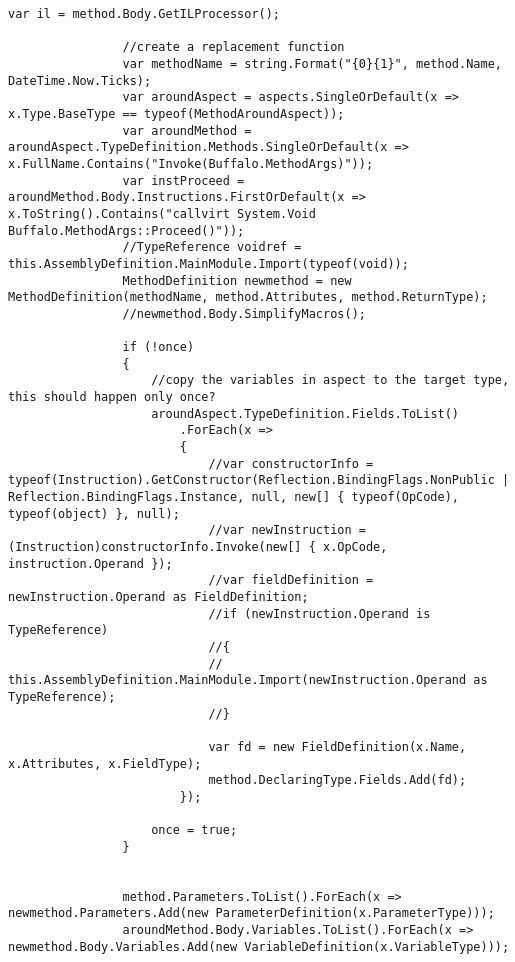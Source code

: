 \begin{lstlisting}[caption={../buffalo/Weaver.cs}, label=../buffalo/Weaver.cs, frame=tb, basicstyle=\scriptsize]
                var il = method.Body.GetILProcessor();

                //create a replacement function
                var methodName = string.Format("{0}{1}", method.Name, DateTime.Now.Ticks);
                var aroundAspect = aspects.SingleOrDefault(x => x.Type.BaseType == typeof(MethodAroundAspect));
                var aroundMethod = aroundAspect.TypeDefinition.Methods.SingleOrDefault(x => x.FullName.Contains("Invoke(Buffalo.MethodArgs)"));
                var instProceed = aroundMethod.Body.Instructions.FirstOrDefault(x => x.ToString().Contains("callvirt System.Void Buffalo.MethodArgs::Proceed()"));
                //TypeReference voidref = this.AssemblyDefinition.MainModule.Import(typeof(void));
                MethodDefinition newmethod = new MethodDefinition(methodName, method.Attributes, method.ReturnType);
                //newmethod.Body.SimplifyMacros();

                if (!once)
                {
                    //copy the variables in aspect to the target type, this should happen only once?
                    aroundAspect.TypeDefinition.Fields.ToList()
                        .ForEach(x =>
                        {
                            //var constructorInfo = typeof(Instruction).GetConstructor(Reflection.BindingFlags.NonPublic | Reflection.BindingFlags.Instance, null, new[] { typeof(OpCode), typeof(object) }, null);
                            //var newInstruction = (Instruction)constructorInfo.Invoke(new[] { x.OpCode, instruction.Operand });
                            //var fieldDefinition = newInstruction.Operand as FieldDefinition;
                            //if (newInstruction.Operand is TypeReference)
                            //{
                            //    this.AssemblyDefinition.MainModule.Import(newInstruction.Operand as TypeReference);
                            //}

                            var fd = new FieldDefinition(x.Name, x.Attributes, x.FieldType);                            
                            method.DeclaringType.Fields.Add(fd);
                        });

                    once = true;
                }


                method.Parameters.ToList().ForEach(x => newmethod.Parameters.Add(new ParameterDefinition(x.ParameterType)));
                aroundMethod.Body.Variables.ToList().ForEach(x => newmethod.Body.Variables.Add(new VariableDefinition(x.VariableType)));
                

\end{lstlisting}
